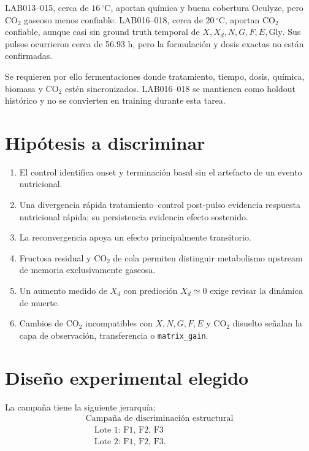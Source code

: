 \documentclass[11pt,a4paper]{article}
\begin{document}
LAB013--015, cerca de \(16\,^{\circ}\mathrm{C}\), aportan química y buena
cobertura Oculyze, pero CO$_2$ gaseoso menos confiable. LAB016--018, cerca de
\(20\,^{\circ}\mathrm{C}\), aportan CO$_2$ confiable, aunque casi sin ground
truth temporal de \(X,X_d,N,G,F,E,\mathrm{Gly}\). Sus pulsos ocurrieron cerca de
56.93 h, pero la formulación y dosis exactas no están confirmadas.

Se requieren por ello fermentaciones donde tratamiento, tiempo, dosis, química,
biomasa y CO$_2$ estén sincronizados. LAB016--018 se mantienen como holdout
histórico y no se convierten en training durante esta tarea.

\section{Hipótesis a discriminar}

\begin{enumerate}[leftmargin=*]
  \item El control identifica onset y terminación basal sin el artefacto de un
  evento nutricional.
  \item Una divergencia rápida tratamiento--control post-pulso evidencia
  respuesta nutricional rápida; su persistencia evidencia efecto sostenido.
  \item La reconvergencia apoya un efecto principalmente transitorio.
  \item Fructosa residual y CO$_2$ de cola permiten distinguir metabolismo
  upstream de memoria exclusivamente gaseosa.
  \item Un aumento medido de \(X_d\) con predicción \(X_d\simeq0\) exige revisar
  la dinámica de muerte.
  \item Cambios de CO$_2$ incompatibles con \(X,N,G,F,E\) y CO$_2$ disuelto
  señalan la capa de observación, transferencia o \texttt{matrix\_gain}.
\end{enumerate}

\section{Diseño experimental elegido}

La campaña tiene la siguiente jerarquía:
\[
\begin{array}{l}
\text{Campaña de discriminación estructural}\\
\quad\text{Lote 1: F1, F2, F3}\\
\quad\text{Lote 2: F1, F2, F3.}
\end{array}
\]
\end{document}
